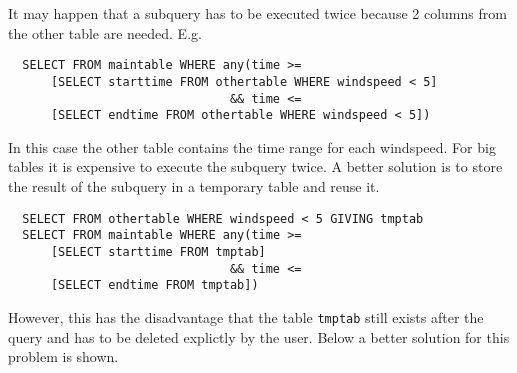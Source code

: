 It may happen that a subquery has to be executed twice because
2 columns from the other table are needed. E.g.
\begin{verbatim}
  SELECT FROM maintable WHERE any(time >=
      [SELECT starttime FROM othertable WHERE windspeed < 5]
                               && time <=
      [SELECT endtime FROM othertable WHERE windspeed < 5])
\end{verbatim}
In this case the other table contains the time range for each windspeed.
For big tables it is expensive to execute the subquery twice.
A better solution
is to store the result of the subquery in a temporary table and reuse it.
\begin{verbatim}
  SELECT FROM othertable WHERE windspeed < 5 GIVING tmptab
  SELECT FROM maintable WHERE any(time >=
      [SELECT starttime FROM tmptab]
                               && time <=
      [SELECT endtime FROM tmptab])
\end{verbatim}
However, this has the disadvantage that the table \texttt{tmptab}
still exists after the query and has to be deleted explictly by the
user. Below a better solution for this problem is shown.

